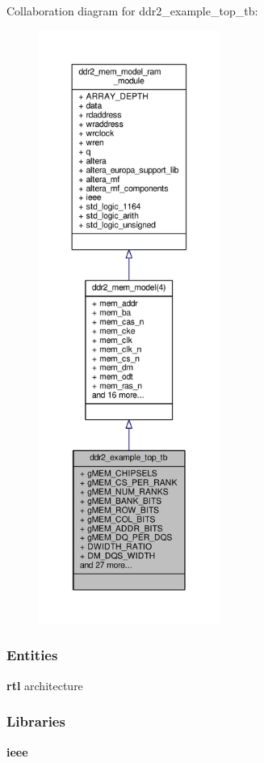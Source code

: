 Collaboration diagram for ddr2\+\_\+example\+\_\+top\+\_\+tb\+:\nopagebreak
\begin{figure}[H]
\begin{center}
\leavevmode
\includegraphics[height=550pt]{dd/dfe/classddr2__example__top__tb__coll__graph}
\end{center}
\end{figure}
\subsubsection*{Entities}
\begin{DoxyCompactItemize}
\item 
{\bf rtl} architecture
\end{DoxyCompactItemize}
\subsubsection*{Libraries}
 \begin{DoxyCompactItemize}
\item 
{\bf ieee} 
\end{DoxyCompactItemize}
